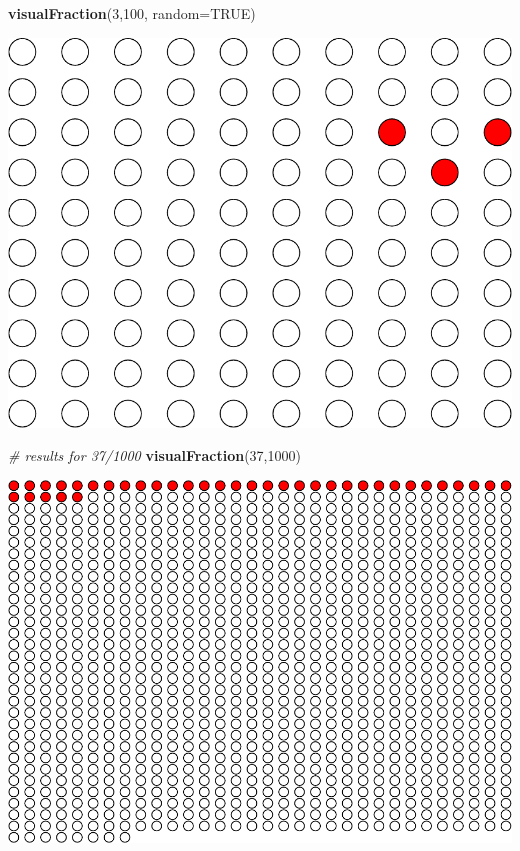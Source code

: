 \documentclass[9pt,letter]{article}
\newenvironment{Shaded}{\begin{snugshade}}{\end{snugshade}}
\newcommand{\KeywordTok}[1]{\textcolor[rgb]{0.13,0.29,0.53}{\textbf{#1}}}
\newcommand{\DataTypeTok}[1]{\textcolor[rgb]{0.13,0.29,0.53}{#1}}
\newcommand{\DecValTok}[1]{\textcolor[rgb]{0.00,0.00,0.81}{#1}}
\newcommand{\CommentTok}[1]{\textcolor[rgb]{0.56,0.35,0.01}{\textit{#1}}}
\newcommand{\OtherTok}[1]{\textcolor[rgb]{0.56,0.35,0.01}{#1}}
\newcommand{\NormalTok}[1]{#1}
\begin{document}
\begin{enumerate}
\begin{Shaded}
\begin{Highlighting}[]
\KeywordTok{visualFraction}\NormalTok{(}\DecValTok{3}\NormalTok{,}\DecValTok{100}\NormalTok{, }\DataTypeTok{random=}\OtherTok{TRUE}\NormalTok{)}
\end{Highlighting}
\end{Shaded}

  \includegraphics{a2_solutions_files/figure-latex/unnamed-chunk-3-2.pdf}

\begin{Shaded}
\begin{Highlighting}[]
\CommentTok{# results for 37/1000}
\KeywordTok{visualFraction}\NormalTok{(}\DecValTok{37}\NormalTok{,}\DecValTok{1000}\NormalTok{)}
\end{Highlighting}
\end{Shaded}

  \includegraphics{a2_solutions_files/figure-latex/unnamed-chunk-4-1.pdf}


\end{enumerate}
\end{document}
